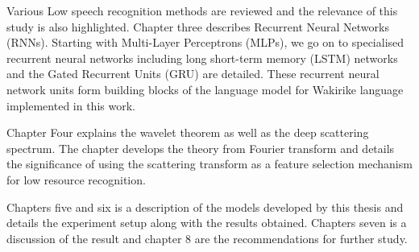 Various Low speech recognition methods are reviewed and the relevance of this study is also highlighted.  Chapter three describes Recurrent Neural Networks (RNNs). Starting with Multi-Layer Perceptrons (MLPs), we go on to specialised recurrent neural networks including long short-term memory (LSTM) networks and the Gated Recurrent Units (GRU) are detailed. These recurrent neural network units form building blocks of the language model for Wakirike language implemented in this work.

Chapter Four explains the wavelet theorem as well as the deep scattering spectrum. The chapter develops the theory from Fourier transform and details the significance of using the scattering transform as a feature selection mechanism for low resource recognition.  

Chapters five and six is a description of the models developed by this thesis and details the experiment setup along with the results obtained. Chapters seven is a discussion of the result and chapter 8 are the recommendations for further study. 


